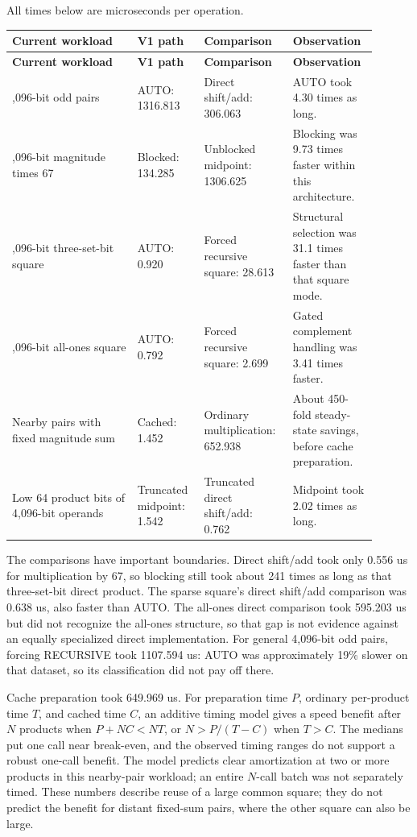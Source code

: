 \documentclass[11pt,a4paper]{article}
\begin{document}
All times below are microseconds per operation.

\begingroup
\small
\setlength{\tabcolsep}{4pt}
\begin{longtable}{>{\raggedright\arraybackslash}p{0.32\linewidth}>{\raggedright\arraybackslash}p{0.17\linewidth}>{\raggedright\arraybackslash}p{0.22\linewidth}>{\raggedright\arraybackslash}p{0.19\linewidth}}
\toprule
\textbf{Current workload} & \textbf{V1 path} & \textbf{Comparison} & \textbf{Observation} \\
\midrule
\endfirsthead
\toprule
\textbf{Current workload} & \textbf{V1 path} & \textbf{Comparison} & \textbf{Observation} \\
\midrule
\endhead
\bottomrule
\endfoot
4,096-bit odd pairs & AUTO: 1316.813 & Direct shift/add: 306.063 & AUTO took 4.30 times as long. \\
4,096-bit magnitude times 67 & Blocked: 134.285 & Unblocked midpoint: 1306.625 & Blocking was 9.73 times faster within this architecture. \\
4,096-bit three-set-bit square & AUTO: 0.920 & Forced recursive square: 28.613 & Structural selection was 31.1 times faster than that square mode. \\
4,096-bit all-ones square & AUTO: 0.792 & Forced recursive square: 2.699 & Gated complement handling was 3.41 times faster. \\
Nearby pairs with fixed magnitude sum & Cached: 1.452 & Ordinary multiplication: 652.938 & About 450-fold steady-state savings, before cache preparation. \\
Low 64 product bits of 4,096-bit operands & Truncated midpoint: 1.542 & Truncated direct shift/add: 0.762 & Midpoint took 2.02 times as long. \\
\end{longtable}
\endgroup

The comparisons have important boundaries. Direct shift/add took only 0.556 us for multiplication by 67, so blocking still took about 241 times as long as that three-set-bit direct product. The sparse square's direct shift/add comparison was 0.638 us, also faster than AUTO. The all-ones direct comparison took 595.203 us but did not recognize the all-ones structure, so that gap is not evidence against an equally specialized direct implementation. For general 4,096-bit odd pairs, forcing RECURSIVE took 1107.594 us: AUTO was approximately 19\% slower on that dataset, so its classification did not pay off there.

Cache preparation took 649.969 us. For preparation time $P$, ordinary per-product time $T$, and cached time $C$, an additive timing model gives a speed benefit after $N$ products when $P+NC<NT$, or $N>P/(T-C)$ when $T>C$. The medians put one call near break-even, and the observed timing ranges do not support a robust one-call benefit. The model predicts clear amortization at two or more products in this nearby-pair workload; an entire $N$-call batch was not separately timed. These numbers describe reuse of a large common square; they do not predict the benefit for distant fixed-sum pairs, where the other square can also be large.
\end{document}
